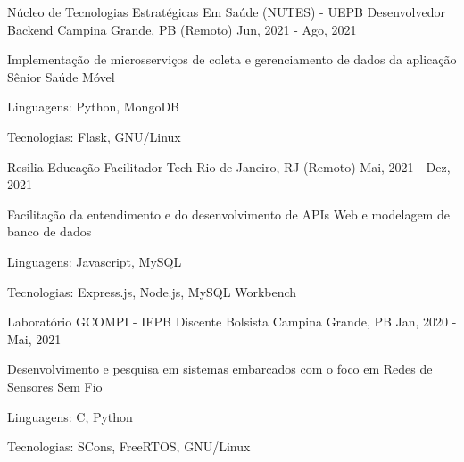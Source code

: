 \begin{cventries}
  \cventry
  {Núcleo de Tecnologias Estratégicas Em Saúde (NUTES) - UEPB} %
  {Desenvolvedor Backend} %
  {Campina Grande, PB (Remoto)} %
  {Jun, 2021 - Ago, 2021} %
  {
    \begin{cvitems} %
      \item {Implementação de microsserviços de coleta e gerenciamento de dados da aplicação Sênior Saúde Móvel}
      \item {Linguagens: Python, MongoDB}
      \item {Tecnologias: Flask, GNU/Linux}
    \end{cvitems}
  }

  \cventry
  {Resilia Educação} %
  {Facilitador Tech} %
  {Rio de Janeiro, RJ (Remoto)} %
  {Mai, 2021 - Dez, 2021} %
  {
    \begin{cvitems} %
      \item {Facilitação da entendimento e do desenvolvimento de APIs Web e modelagem de banco de dados}
      \item {Linguagens: Javascript, MySQL}
      \item {Tecnologias: Express.js, Node.js, MySQL Workbench}
    \end{cvitems}
  }

  \cventry
  {Laboratório GCOMPI - IFPB} %
  {Discente Bolsista} %
  {Campina Grande, PB} %
  {Jan, 2020 - Mai, 2021} %
  {
    \begin{cvitems} %
      \item {Desenvolvimento e pesquisa em sistemas embarcados com o foco em Redes de Sensores Sem Fio}
      \item {Linguagens: C, Python}
      \item {Tecnologias: SCons, FreeRTOS, GNU/Linux}
    \end{cvitems}
  }
\end{cventries}
